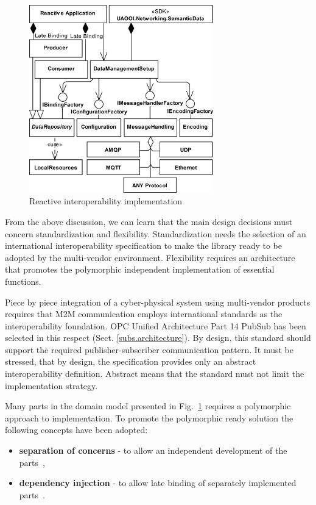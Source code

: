 \documentclass{jacsart}
\begin{document}
\begin{figure}
      \centering
      \includegraphics[width=8cm]{../.Media/UADataApplicationArchitecture.png}
      \caption{Reactive interoperability implementation}\label{figure2.UADataApplicationArchitecture}
\end{figure}

From the above discussion, we can learn that the main design decisions must concern standardization and flexibility. Standardization needs the selection of an international interoperability specification to make the library ready to be adopted by the multi-vendor environment. Flexibility requires an architecture that promotes the polymorphic independent implementation of essential functions.

Piece by piece integration of a cyber-physical system using multi-vendor products requires that M2M communication employs international standards as the interoperability foundation. OPC Unified Architecture Part 14 PubSub has been selected in this respect (Sect. \ref*{subs.architecture}). By design, this standard should support the required publisher-subscriber communication pattern. It must be stressed, that by design, the specification provides only an abstract interoperability definition. Abstract means that the standard must not limit the implementation strategy.

Many parts in the domain model presented in Fig.~\ref*{figure2.UADataApplicationArchitecture} requires a polymorphic approach to implementation. To promote the polymorphic ready solution the following concepts have been adopted:

\begin{itemize}
      \item \textbf{separation of concerns} - to allow an independent development of the parts~\cite{RefWorks:doc:5d92609be4b02eb43d372bd1},
      \item \textbf{dependency injection} - to allow late binding of separately implemented parts~\cite{RefWorks:doc:5d925b77e4b030b4e0596f5d}.
\end{itemize}
\end{document}
